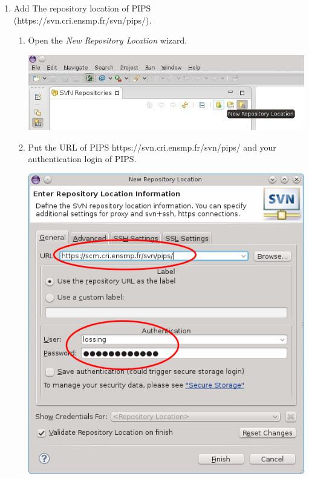 \documentclass[a4paper]{article}
\begin{document}
\begin{enumerate}
\item Add The repository location of PIPS \\(https://svn.cri.ensmp.fr/svn/pips/).
\begin{enumerate}
\item Open the \emph{New Repository Location} wizard.
\begin{center}
\noindent
\includegraphics[scale=0.4]{eclipse/02-eclipseJUNO-newRepositories2.jpg}
\end{center}

\item Put the URL of PIPS https://svn.cri.ensmp.fr/svn/pips/ and your authentication login of PIPS.
\begin{center}
\noindent
\includegraphics[scale=0.4]{eclipse/02-eclipseJUNO-newRepositories3.png}
\end{center}


\end{enumerate}
\end{enumerate}
\end{document}
